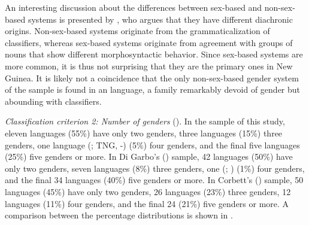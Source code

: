 \documentclass[output=collectionpaper]{langsci/langscibook}
\begin{document}
An interesting discussion about the differences between sex-based and non-sex-based systems is presented by \citet{Luraghi2011}, who argues that they have different diachronic origins. Non-sex-based systems originate from the grammaticalization of classifiers, whereas sex-based systems originate from agreement with groups of nouns that show different morphosyntactic behavior. Since sex-based systems are more common, it is thus not surprising that they are the primary ones in New Guinea. It is likely not a coincidence that the only non-sex-based gender system of the sample is found in an  language, a family remarkably devoid of gender but abounding with classifiers.


\textit{Classification criterion 2: Number of genders} ().
In the sample of this study, eleven languages (55\%) have only two genders, three languages (15\%) three genders, one language (; TNG, -) (5\%) four genders, and the final five languages (25\%) five genders or more. In Di Garbo's (\citeyear[65]{DiGarbo2014}) sample, 42 languages (50\%) have only two genders, seven languages (8\%) three genders, one (; ) (1\%) four genders, and the final 34 languages (40\%) five genders or more. In Corbett's (\citeyear{Corbett2013}) sample, 50 languages (45\%) have only two genders, 26 languages (23\%) three genders, 12 languages (11\%) four genders, and the final 24 (21\%) five genders or more. A comparison between the percentage distributions is shown in .
\end{document}
